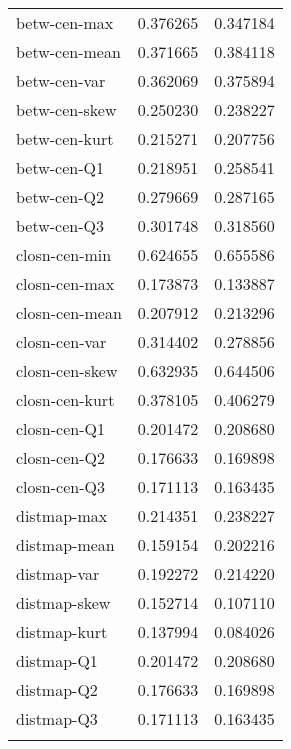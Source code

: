 \begin{longtable}{lrr}
	betw-cen-max                  &  0.376265 &  0.347184 \\
	betw-cen-mean                 &  0.371665 &  0.384118 \\
	betw-cen-var                  &  0.362069 &  0.375894 \\
	betw-cen-skew                 &  0.250230 &  0.238227 \\
	betw-cen-kurt                 &  0.215271 &  0.207756 \\
	betw-cen-Q1                   &  0.218951 &  0.258541 \\
	betw-cen-Q2                   &  0.279669 &  0.287165 \\
	betw-cen-Q3                   &  0.301748 &  0.318560 \\
	closn-cen-min                 &  0.624655 &  0.655586 \\
	closn-cen-max                 &  0.173873 &  0.133887 \\
	closn-cen-mean                &  0.207912 &  0.213296 \\
	closn-cen-var                 &  0.314402 &  0.278856 \\
	closn-cen-skew                &  0.632935 &  0.644506 \\
	closn-cen-kurt                &  0.378105 &  0.406279 \\
	closn-cen-Q1                  &  0.201472 &  0.208680 \\
	closn-cen-Q2                  &  0.176633 &  0.169898 \\
	closn-cen-Q3                  &  0.171113 &  0.163435 \\
	distmap-max                   &  0.214351 &  0.238227 \\
	distmap-mean                  &  0.159154 &  0.202216 \\
	distmap-var                   &  0.192272 &  0.214220 \\
	distmap-skew                  &  0.152714 &  0.107110 \\
	distmap-kurt                  &  0.137994 &  0.084026 \\
	distmap-Q1                    &  0.201472 &  0.208680 \\
	distmap-Q2                    &  0.176633 &  0.169898 \\
	distmap-Q3                    &  0.171113 &  0.163435 \\
	\label{tab:results-stats}
\end{longtable}



